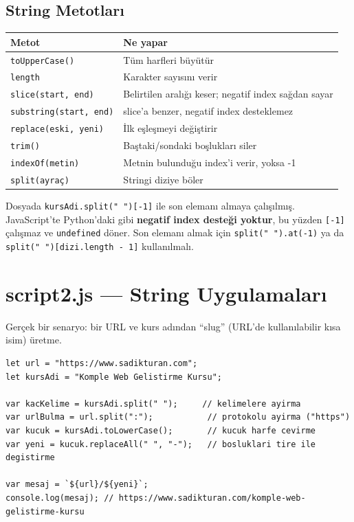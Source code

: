 \documentclass[11pt,a4paper]{article}
\begin{document}
\subsection*{String Metotları}

\begin{center}
\begin{tabular}{@{}p{4cm}p{9.5cm}@{}}
\toprule
\textbf{Metot} & \textbf{Ne yapar} \\
\midrule
\texttt{toUpperCase()} & Tüm harfleri büyütür \\
\texttt{length} & Karakter sayısını verir \\
\texttt{slice(start, end)} & Belirtilen aralığı keser; negatif index sağdan sayar \\
\texttt{substring(start, end)} & slice'a benzer, negatif index desteklemez \\
\texttt{replace(eski, yeni)} & İlk eşleşmeyi değiştirir \\
\texttt{trim()} & Baştaki/sondaki boşlukları siler \\
\texttt{indexOf(metin)} & Metnin bulunduğu index'i verir, yoksa -1 \\
\texttt{split(ayraç)} & Stringi diziye böler \\
\bottomrule
\end{tabular}
\end{center}

\begin{dikkat}
Dosyada \texttt{kursAdi.split(" ")[-1]} ile son elemanı almaya çalışılmış. JavaScript'te Python'daki gibi \textbf{negatif index desteği yoktur}, bu yüzden \texttt{[-1]} çalışmaz ve \texttt{undefined} döner. Son elemanı almak için \texttt{split(" ").at(-1)} ya da \texttt{split(" ")[dizi.length - 1]} kullanılmalı.
\end{dikkat}

\newpage

\section{script2.js --- String Uygulamaları}

Gerçek bir senaryo: bir URL ve kurs adından ``slug'' (URL'de kullanılabilir kısa isim) üretme.

\begin{lstlisting}
let url = "https://www.sadikturan.com";
let kursAdi = "Komple Web Gelistirme Kursu";

var kacKelime = kursAdi.split(" ");     // kelimelere ayirma
var urlBulma = url.split(":");           // protokolu ayirma ("https")
var kucuk = kursAdi.toLowerCase();       // kucuk harfe cevirme
var yeni = kucuk.replaceAll(" ", "-");   // bosluklari tire ile degistirme

var mesaj = `${url}/${yeni}`;
console.log(mesaj); // https://www.sadikturan.com/komple-web-gelistirme-kursu
\end{lstlisting}
\end{document}
